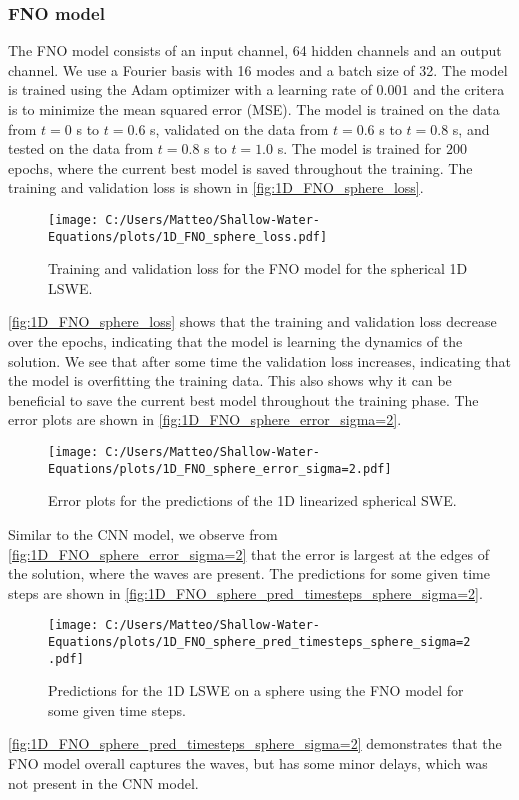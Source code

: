 \subsubsection*{FNO model}
The FNO model consists of an input channel, 64 hidden channels and an output channel. We use a Fourier basis with 16 modes and a batch size of 32.
The model is trained using the Adam optimizer with a learning rate of $0.001$ and the critera is to minimize the mean squared error (MSE).
The model is trained on the data from $t = 0$ s to $t = 0.6$ s, validated on the data from $t = 0.6$ s to $t = 0.8$ s, and tested on the data from $t = 0.8$ s to $t = 1.0$ s.
The model is trained for $200$ epochs, where the current best model is saved throughout the training.
The training and validation loss is shown in \autoref{fig:1D_FNO_sphere_loss}.
\begin{figure}[H]
    \centering
    \texttt{[image: C:/Users/Matteo/Shallow-Water-Equations/plots/1D\_FNO\_sphere\_loss.pdf]}
    \caption{Training and validation loss for the FNO model for the spherical 1D LSWE.}\label{fig:1D_FNO_sphere_loss}
\end{figure}
\autoref{fig:1D_FNO_sphere_loss} shows that the training and validation loss decrease over the epochs, indicating that the model is learning the dynamics of the solution.
We see that after some time the validation loss increases, indicating that the model is overfitting the training data.
This also shows why it can be beneficial to save the current best model throughout the training phase.
The error plots are shown in \autoref{fig:1D_FNO_sphere_error_sigma=2}.
\begin{figure}[H]
    \centering
    \texttt{[image: C:/Users/Matteo/Shallow-Water-Equations/plots/1D\_FNO\_sphere\_error\_sigma=2.pdf]}
    \caption{Error plots for the predictions of the 1D linearized spherical SWE.}\label{fig:1D_FNO_sphere_error_sigma=2}
\end{figure}
Similar to the CNN model, we observe from \autoref{fig:1D_FNO_sphere_error_sigma=2} that the error is largest at the edges of the solution, where the waves are present.
The predictions for some given time steps are shown in \autoref{fig:1D_FNO_sphere_pred_timesteps_sphere_sigma=2}.
\begin{figure}[H]
    \centering
    \texttt{[image: C:/Users/Matteo/Shallow-Water-Equations/plots/1D\_FNO\_sphere\_pred\_timesteps\_sphere\_sigma=2.pdf]}
    \caption{Predictions for the 1D LSWE on a sphere using the FNO model for some given time steps.}\label{fig:1D_FNO_sphere_pred_timesteps_sphere_sigma=2}
\end{figure}
\autoref{fig:1D_FNO_sphere_pred_timesteps_sphere_sigma=2} demonstrates that the FNO model overall captures the waves, but has some minor delays, which was not present in the CNN model.

